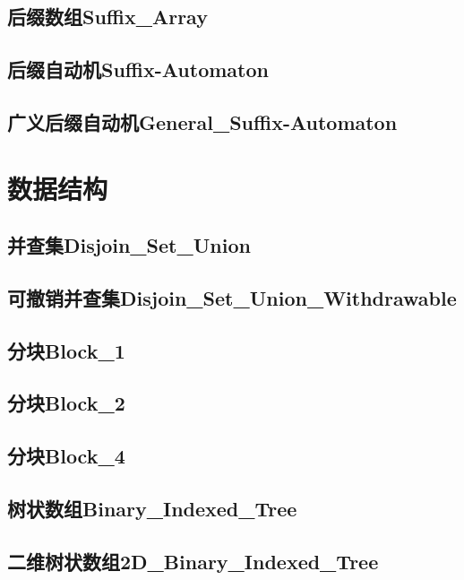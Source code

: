 \documentclass[10pt,a4paper]{article}
\begin{document}
\subsection{后缀数组Suffix\_Array}

\subsection{后缀自动机Suffix-Automaton}

\subsection{广义后缀自动机General\_Suffix-Automaton}


\newpage
\section{数据结构}
\subsection{并查集Disjoin\_Set\_Union}

\subsection{可撤销并查集Disjoin\_Set\_Union\_Withdrawable}

\subsection{分块Block\_1}

\subsection{分块Block\_2}

\subsection{分块Block\_4}

\subsection{树状数组Binary\_Indexed\_Tree}

\subsection{二维树状数组2D\_Binary\_Indexed\_Tree}

\end{document}
